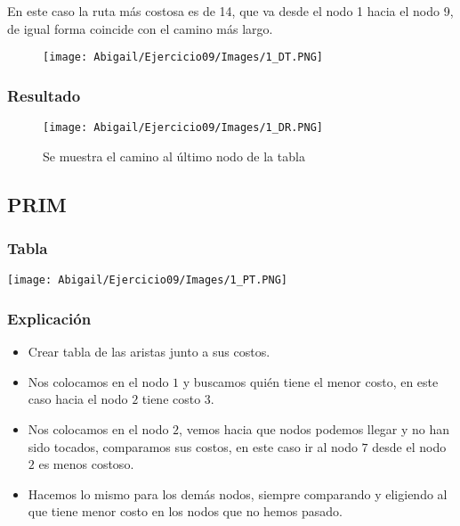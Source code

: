 \documentclass[12pt]{article}
\begin{document}
        En este caso la ruta más costosa es de 14, que va desde el nodo 1 hacia el nodo 9, de igual forma coincide con el camino más largo.

        \begin{figure}[h!]
          \centering
          \texttt{[image: Abigail/Ejercicio09/Images/1\_DT.PNG]}
        \end{figure} 
\newpage
      \subsubsection{Resultado}
      
        \begin{figure}[h!]
          \centering
          \texttt{[image: Abigail/Ejercicio09/Images/1\_DR.PNG]}
          \caption{Se muestra el camino al último nodo de la tabla}
        \end{figure} 


    \subsection{PRIM}
        \begin{multicols}{2}
            \subsubsection{Tabla}
              
                  \texttt{[image: Abigail/Ejercicio09/Images/1\_PT.PNG]}
              
        \columnbreak
        
            \subsubsection{Explicación}
                \begin{itemize}
        
                  \item[\checkmark] Crear tabla de las aristas junto a sus costos.
        
                  \item[\checkmark] Nos colocamos en el nodo $1$ y buscamos quién tiene el menor costo, en este caso hacia el nodo $2$ tiene costo $3$.
                  
                  \item[\checkmark] Nos colocamos en el nodo $2$, vemos hacia que nodos podemos llegar y no han sido tocados, comparamos sus costos, en este caso ir al nodo $7$ desde el nodo $2$ es menos costoso.
         
                  \item[\checkmark] Hacemos lo mismo para los demás nodos, siempre comparando y eligiendo al que tiene menor costo en los nodos que no hemos pasado.
        
                \end{itemize}
        \end{multicols}
\newpage
\end{document}
